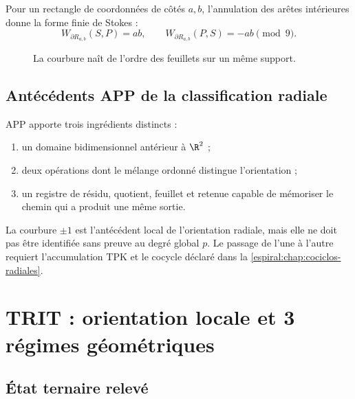 Pour un rectangle de coordonnées de côtés \(a,b\), l'annulation des arêtes intérieures donne la forme finie de Stokes :
\[
 W_{\partial R_{a,b}}(S,P)=ab,\qquad
 W_{\partial R_{a,b}}(P,S)=-ab\pmod9.
\]

\begin{figure}[htbp]
\centering
{}
\caption{La courbure naît de l'ordre des feuillets sur un même support.}
\label{espiral:fig:curvatura-app}
\end{figure}

\section{Antécédents APP de la classification radiale}

APP apporte trois ingrédients distincts :
\begin{enumerate}
\item un domaine bidimensionnel antérieur à \(\R^2\) ;
\item deux opérations dont le mélange ordonné distingue l'orientation ;
\item un registre de résidu, quotient, feuillet et retenue capable de mémoriser le chemin qui a produit une même sortie.
\end{enumerate}
La courbure \(\pm1\) est l'antécédent local de l'orientation radiale, mais elle ne doit pas être identifiée sans preuve au degré global \(p\). Le passage de l'une à l'autre requiert l'accumulation TPK et le cocycle déclaré dans la \cref{espiral:chap:cociclos-radiales}.

\chapter{TRIT : orientation locale et 3 régimes géométriques}

\section{État ternaire relevé}

